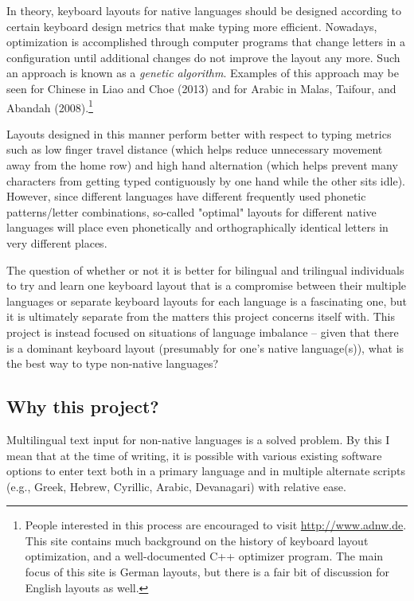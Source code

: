 \documentclass[11pt]{article}
\begin{document}
In theory, keyboard layouts for native languages should be designed according to certain keyboard design metrics that make typing more efficient. Nowadays, optimization is accomplished through computer programs that change letters in a configuration until additional changes do not improve the layout any more. Such an approach is known as a \emph{genetic algorithm}. Examples of this approach may be seen for Chinese in Liao and Choe (2013) and for Arabic in Malas, Taifour, and Abandah (2008).\footnote{People interested in this process are encouraged to visit \url{http://www.adnw.de}. This site contains much background on the history of keyboard layout optimization, and a well-documented C++ optimizer program. The main focus of this site is German layouts, but there is a fair bit of discussion for English layouts as well.}

Layouts designed in this manner perform better with respect to typing metrics such as low finger travel distance (which helps reduce unnecessary movement away from the home row) and high hand alternation (which helps prevent many characters from getting typed contiguously by one hand while the other sits idle). However, since different languages have different frequently used phonetic patterns/letter combinations, so-called "optimal" layouts for different native languages will place even phonetically and orthographically identical letters in very different places.

The question of whether or not it is better for bilingual and trilingual individuals to try and learn one keyboard layout that is a compromise between their multiple languages or separate keyboard layouts for each language is a fascinating one, but it is ultimately separate from the matters this project concerns itself with. This project is instead focused on situations of language imbalance -- given that there is a dominant keyboard layout (presumably for one's native language(s)), what is the best way to type non-native languages?

\subsection{Why this project?}
\label{sec:org3b66fd0}

Multilingual text input for non-native languages is a solved problem. By this I mean that at the time of writing, it is possible with various existing software options to enter text both in a primary language and in multiple alternate scripts (e.g., Greek, Hebrew, Cyrillic, Arabic, Devanagari) with relative ease.
\end{document}
